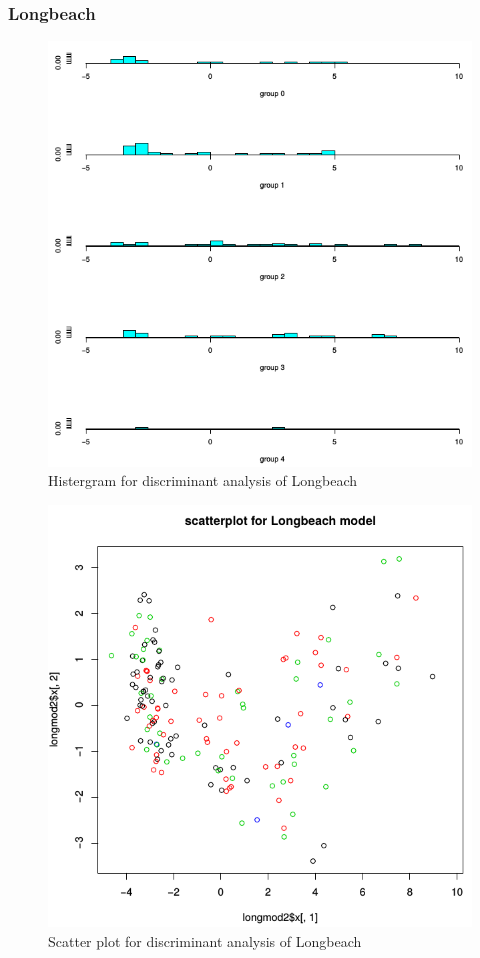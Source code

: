 \documentclass[a4paper]{article}
\begin{document}
\newpage
\subsubsection{Longbeach}



\begin{figure}[H]
	\begin{center}
		\includegraphics[width=12cm]{Q4_pics/Long-Histgram.png}
	\end{center}
	\caption{Histergram for discriminant analysis of Longbeach}
	\label{q4_long_historgram}
\end{figure}

\begin{figure}[H]
	\begin{center}
		\includegraphics[width=12cm]{Q4_pics/Long-scatter.png}
	\end{center}
	\caption{Scatter plot for discriminant analysis of Longbeach}
	\label{q4_long_scatter}
\end{figure}
\end{document}
